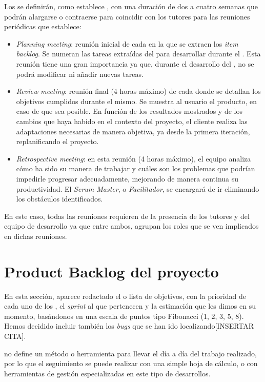 Los \sprints{} se definirán, como establece \scrum{}, con una duración de dos a cuatro semanas que podrán alargarse o contraerse para coincidir con los tutores para las reuniones periódicas que establece:
\begin{itemize}
 \item \textit{Planning meeting}: reunión inicial de cada \sprint{} en la que se extraen los \textit{item backlog}. Se numeran las tareas extraídas del \productbacklog{} para desarrollar durante el \sprint{}. Esta reunión tiene una gran importancia ya que, durante el desarrollo del \sprint{}, no se podrá modificar ni añadir nuevas tareas.
 \item \textit{Review meeting}: reunión final (4 horas máximo) de cada \sprint{} donde se detallan los objetivos cumplidos durante el mismo. Se muestra al usuario el producto, en caso de que sea posible. En función de los resultados mostrados y de los cambios que haya habido en el contexto del proyecto, el cliente realiza las adaptaciones necesarias de manera objetiva, ya desde la primera iteración, replanificando el proyecto.
 \item \textit{Retrospective meeting}: en esta reunión (4 horas máximo), el equipo analiza cómo ha sido su manera de trabajar y cuáles son los problemas que podrían impedirle progresar adecuadamente, mejorando de manera continua su productividad. El \textit{Scrum Master}, o \textit{Facilitador}, se encargará de ir eliminando los obstáculos identificados.
\end{itemize}

En este caso, todas las reuniones requieren de la presencia de los tutores y del equipo de desarrollo ya que entre ambos, agrupan los roles que se ven implicados en dichas reuniones.
\newpage



\section{Product Backlog del proyecto}
En esta sección, aparece redactado el \productbacklog{}  o lista de objetivos, con la prioridad de cada uno de los \productitem{}, el \textit{sprint} al que pertenecen y la estimación que les dimos en su momento, basándonos en una escala de puntos tipo Fibonacci (1, 2, 3, 5, 8). Hemos decidido incluir también los \textit{bugs} que se han ido localizando[INSERTAR CITA].

\scrum{} no define un método o herramienta para llevar el día a día del trabajo realizado, por lo que el seguimiento se puede realizar con una simple hoja de cálculo, o con herramientas de gestión especializadas en este tipo de desarrollos.

